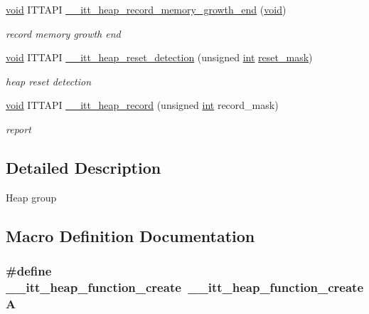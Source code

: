 \begin{DoxyCompactItemize}
\hyperlink{ittnotify__static_8h_af941d56e55e3c5465135b60c4d6343ed}{void} I\-T\-T\-A\-P\-I \hyperlink{group__heap_ga4127abefaf89ca2c2a76c70dc0d7e124}{\-\_\-\-\_\-itt\-\_\-heap\-\_\-record\-\_\-memory\-\_\-growth\-\_\-end} (\hyperlink{ittnotify__static_8h_af941d56e55e3c5465135b60c4d6343ed}{void})
\begin{DoxyCompactList}\small\item\em record memory growth end \end{DoxyCompactList}\item 
\hyperlink{ittnotify__static_8h_af941d56e55e3c5465135b60c4d6343ed}{void} I\-T\-T\-A\-P\-I \hyperlink{group__heap_gae980b97cc0134229a27c1b6263def28c}{\-\_\-\-\_\-itt\-\_\-heap\-\_\-reset\-\_\-detection} (unsigned \hyperlink{ittnotify__static_8h_a8b8dcd723308a8cb5d84277c7a3fff70}{int} \hyperlink{ittnotify__static_8h_a6350ab195f6b73ea7090db0060d0e2bc}{reset\-\_\-mask})
\begin{DoxyCompactList}\small\item\em heap reset detection \end{DoxyCompactList}\item 
\hyperlink{ittnotify__static_8h_af941d56e55e3c5465135b60c4d6343ed}{void} I\-T\-T\-A\-P\-I \hyperlink{group__heap_ga8de33699cca1b37a8309d8047124174e}{\-\_\-\-\_\-itt\-\_\-heap\-\_\-record} (unsigned \hyperlink{ittnotify__static_8h_a8b8dcd723308a8cb5d84277c7a3fff70}{int} record\-\_\-mask)
\begin{DoxyCompactList}\small\item\em report \end{DoxyCompactList}\end{DoxyCompactItemize}


\subsection{Detailed Description}
Heap group 

\subsection{Macro Definition Documentation}
\hypertarget{group__heap_gaee7be7751f527b329c003ab6b448c3b3}{
\subsubsection[{\-\_\-\-\_\-itt\-\_\-heap\-\_\-function\-\_\-create}]{\setlength{\rightskip}{0pt plus 5cm}\#define \-\_\-\-\_\-itt\-\_\-heap\-\_\-function\-\_\-create~{\bf \-\_\-\-\_\-itt\-\_\-heap\-\_\-function\-\_\-create\-A}}}\label{group__heap_gaee7be7751f527b329c003ab6b448c3b3}


